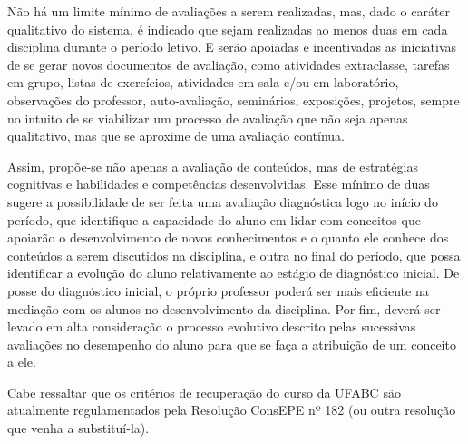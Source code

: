 Não há um limite mínimo de avaliações a serem realizadas, mas, dado o caráter
qualitativo do sistema, é indicado que sejam realizadas ao menos duas em cada
disciplina durante o período letivo.
E serão apoiadas e incentivadas as iniciativas de se gerar novos documentos de
avaliação, como atividades extraclasse, tarefas em grupo, listas de exercícios,
atividades em sala e/ou em laboratório, observações do professor,
auto-avaliação, seminários, exposições, projetos, sempre no intuito de se
viabilizar um processo de avaliação que não seja apenas qualitativo, mas que se
aproxime de uma avaliação contínua.

Assim, propõe-se não apenas a avaliação de conteúdos, mas de estratégias
cognitivas e habilidades e competências desenvolvidas. 
Esse mínimo de duas sugere a possibilidade de ser feita uma avaliação
diagnóstica logo no início do período, que identifique a capacidade do aluno em
lidar com conceitos que apoiarão o desenvolvimento de novos conhecimentos e o
quanto ele conhece dos conteúdos a serem discutidos na disciplina, e outra no
final do período, que possa identificar a evolução do aluno relativamente ao
estágio de diagnóstico inicial. 
De posse do diagnóstico inicial, o próprio professor poderá ser mais eficiente
na mediação com os alunos no desenvolvimento da disciplina. 
Por fim, deverá ser levado em alta consideração o processo evolutivo descrito
pelas sucessivas avaliações no desempenho do aluno para que se faça a
atribuição de um conceito a ele.

Cabe ressaltar que os critérios de recuperação do curso da UFABC são atualmente
regulamentados pela Resolução ConsEPE nº 182 (ou outra resolução que venha a
substituí-la).



